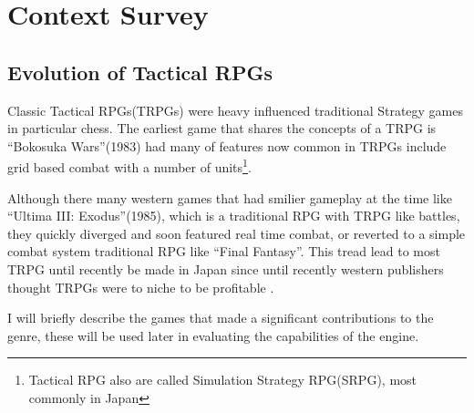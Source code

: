 
\section{Context Survey} 
\label{Context_Survey}

\subsection{Evolution of Tactical RPGs }
\label{sub:evolution_of_tactical_rpgs_}

Classic Tactical RPGs(TRPGs)  were heavy influenced traditional Strategy games in particular chess.  The earliest game that shares the concepts of a TRPG is ``Bokosuka Wars''(1983) had many of features now common in TRPGs include grid based combat with a number of units\cite{BokosukaWars}\footnote{Tactical RPG also are called Simulation Strategy RPG(SRPG),  most commonly in Japan}. 

Although there many western games that had smilier gameplay at the time like ``Ultima III: Exodus''(1985), which is a traditional RPG with TRPG like battles, they quickly diverged and soon featured real time combat, or reverted to a simple combat system traditional RPG like ``Final Fantasy''.  This tread lead to most TRPG until recently be made in Japan since until recently western publishers  thought TRPGs were to niche to be profitable \cite{notrpg}. 

I will briefly describe  the games that made a significant contributions to the genre, these will be used later in evaluating the capabilities of the engine.

